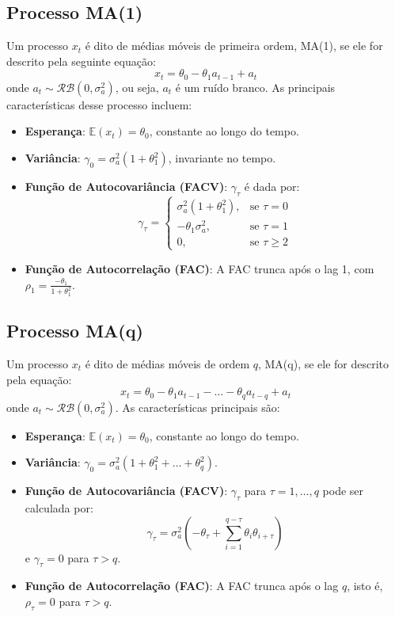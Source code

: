 \documentclass{sciposter}
\begin{document}
\begin{multicols}{3}
\subsection{Processo MA(1)}
Um processo $x_t$ é dito de médias móveis de primeira ordem, MA(1), se ele for descrito pela seguinte equação:
\[
x_t = \theta_0 - \theta_1 a_{t-1} + a_t
\]
onde $a_t \sim \mathcal{RB}(0, \sigma_a^2)$, ou seja, $a_t$ é um ruído branco. As principais características desse processo incluem:
\begin{itemize}
    \item \textbf{Esperança}: $\mathbb{E}(x_t) = \theta_0$, constante ao longo do tempo.
    \item \textbf{Variância}: $\gamma_0 = \sigma_a^2(1 + \theta_1^2)$, invariante no tempo.
    \item \textbf{Função de Autocovariância (FACV)}: $\gamma_\tau$ é dada por:
    \[
    \gamma_\tau =
    \begin{cases}
        \sigma_a^2(1 + \theta_1^2), & \text{se } \tau = 0 \\
        -\theta_1 \sigma_a^2, & \text{se } \tau = 1 \\
        0, & \text{se } \tau \geq 2
    \end{cases}
    \]
    \item \textbf{Função de Autocorrelação (FAC)}: A FAC trunca após o lag 1, com $\rho_1 = \frac{-\theta_1}{1 + \theta_1^2}$.
\end{itemize}

\subsection{Processo MA(q)}
Um processo $x_t$ é dito de médias móveis de ordem $q$, MA(q), se ele for descrito pela equação:
\[
x_t = \theta_0 - \theta_1 a_{t-1} - \dots - \theta_q a_{t-q} + a_t
\]
onde $a_t \sim \mathcal{RB}(0, \sigma_a^2)$. As características principais são:
\begin{itemize}
    \item \textbf{Esperança}: $\mathbb{E}(x_t) = \theta_0$, constante ao longo do tempo.
    \item \textbf{Variância}: $\gamma_0 = \sigma_a^2(1 + \theta_1^2 + \dots + \theta_q^2)$.
    \item \textbf{Função de Autocovariância (FACV)}: $\gamma_\tau$ para $\tau = 1, \dots, q$ pode ser calculada por:
    \[
    \gamma_\tau = \sigma_a^2 \left(-\theta_\tau + \sum_{i=1}^{q-\tau} \theta_i \theta_{i+\tau} \right)
    \]
    e $\gamma_\tau = 0$ para $\tau > q$.
    \item \textbf{Função de Autocorrelação (FAC)}: A FAC trunca após o lag $q$, isto é, $\rho_\tau = 0$ para $\tau > q$.
\end{itemize}


\end{multicols}
\end{document}
